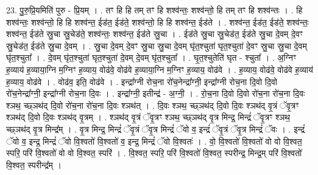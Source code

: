 \documentclass[17pt]{extarticle}
\begin{document}
23. पु॒रु॒प्रि॒यमिति॑ पुरु - प्रि॒यम् । . तꣳ हि हि तम् तꣳ हि शश्व॑न्तः॒ शश्व॑न्तो॒ हि तम् तꣳ हि शश्व॑न्तः । . हि शश्व॑न्तः॒ शश्व॑न्तो॒ हि हि शश्व॑न्त॒ ईड॑त॒ ईड॑ते॒ शश्व॑न्तो॒ हि हि शश्व॑न्त॒ ईड॑ते । . शश्व॑न्त॒ ईड॑त॒ ईड॑ते॒ शश्व॑न्तः॒ शश्व॑न्त॒ ईड॑ते स्रु॒चा स्रु॒चेड॑ते॒ शश्व॑न्तः॒ शश्व॑न्त॒ ईड॑ते स्रु॒चा । . ईड॑ते स्रु॒चा स्रु॒चेड॑त॒ ईड॑ते स्रु॒चा दे॒वम् दे॒वꣳ स्रु॒चेड॑त॒ ईड॑ते स्रु॒चा दे॒वम् । . स्रु॒चा दे॒वम् दे॒वꣳ स्रु॒चा स्रु॒चा दे॒वम् घृ॑त॒श्चुता॑ घृत॒श्चुता॑ दे॒वꣳ स्रु॒चा स्रु॒चा दे॒वम् घृ॑त॒श्चुता᳚ । . दे॒वम् घृ॑त॒श्चुता॑ घृत॒श्चुता॑ दे॒वम् दे॒वम् घृ॑त॒श्चुता᳚ । . घृ॒त॒श्चुतेति॑ घृत - श्चुता᳚ । . अ॒ग्निꣳ ह॒व्याय॑ ह॒व्याया॒ग्नि म॒ग्निꣳ ह॒व्याय॒ वोढ॑वे॒ वोढ॑वे ह॒व्याया॒ग्नि म॒ग्निꣳ ह॒व्याय॒ वोढ॑वे । . ह॒व्याय॒ वोढ॑वे॒ वोढ॑वे ह॒व्याय॑ ह॒व्याय॒ वोढ॑वे । . वोढ॑व॒ इति॒ वोढ॑वे । . इन्द्रा᳚ग्नी रोच॒ना रो॑च॒नेन्द्रा᳚ग्नी॒ इन्द्रा᳚ग्नी रोच॒ना दि॒वो दि॒वो रो॑च॒नेन्द्रा᳚ग्नी॒ इन्द्रा᳚ग्नी रोच॒ना दि॒वः । . इन्द्रा᳚ग्नी॒ इतीन्द्र॑ - अ॒ग्नी॒ । . रो॒च॒ना दि॒वो दि॒वो रो॑च॒ना रो॑च॒ना दि॒वः श्ञथ॒ च्छ्ञथ॑द् दि॒वो रो॑च॒ना रो॑च॒ना दि॒वः श्ञथ॑त् । . दि॒वः श्ञथ॒ च्छ्ञथ॑द् दि॒वो दि॒वः श्ञथ॑द् वृ॒त्रं ॅवृ॒त्रꣳ श्ञथ॑द् दि॒वो दि॒वः श्ञथ॑द् वृ॒त्रम् । . श्ञथ॑द् वृ॒त्रं ॅवृ॒त्रꣳ श्ञथ॒ च्छ्ञथ॑द् वृ॒त्र मिन्द्र॒ मिन्द्रं॑ ॅवृ॒त्रꣳ श्ञथ॒ च्छ्ञथ॑द् वृ॒त्र मिन्द्र᳚म् । . वृ॒त्र मिन्द्र॒ मिन्द्रं॑ ॅवृ॒त्रं ॅवृ॒त्र मिन्द्रं॑ ॅवो व॒ इन्द्रं॑ ॅवृ॒त्रं ॅवृ॒त्र मिन्द्रं॑ ॅवः । . इन्द्रं॑ ॅवो व॒ इन्द्र॒ मिन्द्रं॑ ॅवो वि॒श्वतो॑ वि॒श्वतो॑ व॒ इन्द्र॒ मिन्द्रं॑ ॅवो वि॒श्वतः॑ । . वो॒ वि॒श्वतो॑ वि॒श्वतो॑ वो वो वि॒श्वत॒ स्परि॒ परि॑ वि॒श्वतो॑ वो वो वि॒श्वत॒ स्परि॑ । . वि॒श्वत॒ स्परि॒ परि॑ वि॒श्वतो॑ वि॒श्वत॒ स्परीन्द्र॒ मिन्द्र॒म् परि॑ वि॒श्वतो॑ वि॒श्वत॒ स्परीन्द्र᳚म् । \newline
\end{document}
